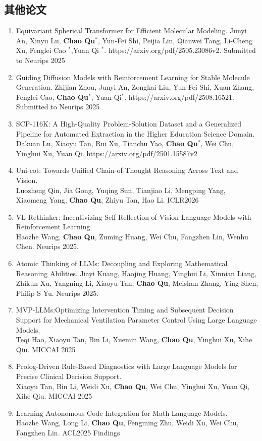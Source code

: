 \documentclass{resume}
\begin{document}
\subsection{其他论文}
\begin{enumerate}
    \item Equivariant Spherical Transformer for Efficient Molecular Modeling.  Junyi An, Xinyu Lu, \textbf{Chao Qu}$^*$, Yun-Fei Shi, Peijia Lin, Qianwei Tang, Li-Cheng Xu, Fenglei Cao $^*$,Yuan Qi $^*$. https://arxiv.org/pdf/2505.23086v2. Submitted to Neurips 2025
    \item Guiding Diffusion Models with Reinforcement Learning for Stable Molecule Generation. 
    Zhijian Zhou,  Junyi An, Zongkai Liu, Yun-Fei Shi, Xuan Zhang, Fenglei Cao,  \textbf{Chao Qu}$^*$, Yuan Qi$^*$. https://arxiv.org/pdf/2508.16521. Submitted to Neurips 2025


    \item SCP-116K: A High-Quality Problem-Solution Dataset and a Generalized Pipeline for Automated Extraction in the Higher Education Science Domain. Dakuan Lu, Xiaoyu Tan, Rui Xu, Tianchu Yao, \textbf{Chao Qu}$^*$, Wei Chu, Yinghui Xu, Yuan Qi. https://arxiv.org/pdf/2501.15587v2

    
    \item Uni-cot: Towards Unified Chain-of-Thought Reasoning Across Text and Vision. \\Luozheng Qin, Jia Gong, Yuqing Sun, Tianjiao Li, Mengping Yang, Xiaomeng Yang, \textbf{Chao Qu}, Zhiyu Tan, Hao Li. ICLR2026
    \item VL-Rethinker: Incentivizing Self-Reflection of Vision-Language Models with Reinforcement Learning. \\ Haozhe Wang, \textbf{Chao Qu}, Zuming Huang, Wei Chu, Fangzhen Lin, Wenhu Chen. Neurips 2025.
    \item Atomic Thinking of LLMs: Decoupling and Exploring Mathematical Reasoning Abilities. Jiayi Kuang, Haojing Huang, Yinghui Li, Xinnian Liang, Zhikun Xu, Yangning Li, Xiaoyu Tan, \textbf{Chao Qu}, Meishan Zhang, Ying Shen, Philip S Yu. Neurips 2025. 
    \item MVP-LLMs:Optimizing Intervention Timing and Subsequent Decision Support for Mechanical Ventilation Parameter Control Using Large Language Models. \\ Teqi Hao, Xiaoyu Tan, Bin Li, Xuemin Wang, \textbf{Chao Qu}, Yinghui Xu, Xihe Qiu. MICCAI 2025
    \item Prolog-Driven Rule-Based Diagnostics with Large Language Models for Precise Clinical Decision Support. \\ Xiaoyu Tan, Bin Li, Weidi Xu, \textbf{Chao Qu}, Wei Chu, Yinghui Xu, Yuan Qi, Xihe Qiu. MICCAI 2025
    \item Learning Autonomous Code Integration for Math Language Models.\\ Haozhe Wang, Long Li, \textbf{Chao Qu}, Fengming Zhu, Weidi Xu, Wei Chu, Fangzhen Lin. ACL2025 Findings


\end{enumerate}
\end{document}
